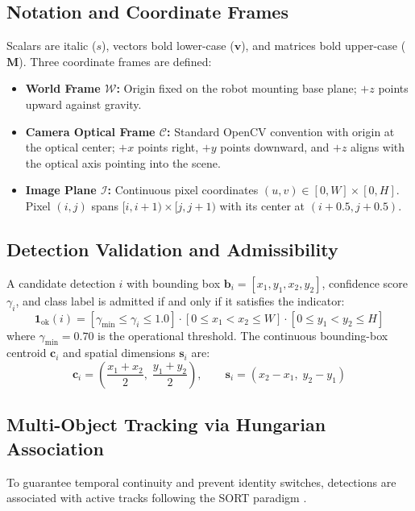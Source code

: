 \documentclass[10pt,a4paper]{article}
\begin{document}
\subsection{Notation and Coordinate Frames}
Scalars are italic ($s$), vectors bold lower-case ($\mathbf{v}$), and matrices bold upper-case ($\mathbf{M}$). Three coordinate frames are defined:
\begin{itemize}
    \item \textbf{World Frame $\mathcal{W}$:} Origin fixed on the robot mounting base plane; $+z$ points upward against gravity.
    \item \textbf{Camera Optical Frame $\mathcal{C}$:} Standard OpenCV convention \cite{hartley2004multiple} with origin at the optical center; $+x$ points right, $+y$ points downward, and $+z$ aligns with the optical axis pointing into the scene.
    \item \textbf{Image Plane $\mathcal{I}$:} Continuous pixel coordinates $(u, v) \in [0, W] \times [0, H]$. Pixel $(i, j)$ spans $[i, i+1) \times [j, j+1)$ with its center at $(i+0.5, j+0.5)$.
\end{itemize}

\subsection{Detection Validation and Admissibility}
A candidate detection $i$ with bounding box $\mathbf{b}_i = [x_1, y_1, x_2, y_2]$, confidence score $\gamma_i$, and class label is admitted if and only if it satisfies the indicator:
\begin{equation}
\mathbf{1}_{\mathrm{ok}}(i) = \left[\gamma_{\min} \le \gamma_i \le 1.0\right] \cdot \left[0 \le x_1 < x_2 \le W\right] \cdot \left[0 \le y_1 < y_2 \le H\right]
\end{equation}
where $\gamma_{\min} = 0.70$ is the operational threshold. The continuous bounding-box centroid $\mathbf{c}_i$ and spatial dimensions $\mathbf{s}_i$ are:
\begin{equation}
\mathbf{c}_i = \left(\frac{x_1 + x_2}{2}, \; \frac{y_1 + y_2}{2}\right), \qquad \mathbf{s}_i = \left(x_2 - x_1, \; y_2 - y_1\right)
\end{equation}

\subsection{Multi-Object Tracking via Hungarian Association}
To guarantee temporal continuity and prevent identity switches, detections are associated with active tracks following the SORT paradigm \cite{bewley2016simple, wojke2017simple}.
\end{document}
